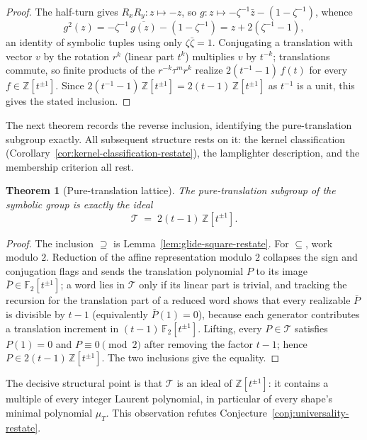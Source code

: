 \documentclass[11pt]{article}
\theoremstyle{plain}
\newtheorem{theorem}{Theorem}
\theoremstyle{definition}
\theoremstyle{remark}
\begin{document}
\begin{proof}
The half-turn gives $R_x R_y \colon z \mapsto -z$, so
$g \colon z \mapsto -\zeta^{-1}\bar z - (1 - \zeta^{-1})$, whence
\[
g^2(z) = -\zeta^{-1}\,\overline{g(z)} - (1-\zeta^{-1})
= z + 2(\zeta^{-1}-1),
\]
an identity of symbolic tuples using only $\zeta\bar\zeta = 1$.
Conjugating a translation with vector $v$ by the rotation $r^{k}$
(linear part $t^{k}$) multiplies $v$ by $t^{-k}$; translations commute,
so finite products of the $r^{-k}\tau^m r^{k}$ realize
$2(t^{-1}-1)\,f(t)$ for every $f \in \mathbb{Z}[t^{\pm 1}]$. Since
$2(t^{-1}-1)\,\mathbb{Z}[t^{\pm 1}] = 2(t-1)\,\mathbb{Z}[t^{\pm 1}]$ as
$t^{-1}$ is a unit, this gives the stated inclusion.
\end{proof}

The next theorem records the reverse inclusion, identifying the
pure-translation subgroup exactly. All subsequent structure rests on it:
the kernel classification (Corollary~\ref{cor:kernel-classification-restate}),
the lamplighter description, and the membership criterion all rest.

\begin{theorem}[Pure-translation lattice]
\label{thm:translation-lattice-symbolic}
The pure-translation subgroup of the symbolic group is exactly the ideal
\[
\mathcal{T} \;=\; 2(t-1)\,\mathbb{Z}[t^{\pm 1}].
\]
\end{theorem}

\begin{proof}
The inclusion $\supseteq$ is
Lemma~\ref{lem:glide-square-restate}. For $\subseteq$, work modulo $2$.
Reduction of the affine representation modulo $2$ collapses the sign and
conjugation flags and sends the translation polynomial $P$ to its image
$\bar P \in \mathbb{F}_2[t^{\pm 1}]$; a word lies in $\mathcal{T}$ only if
its linear part is trivial, and tracking the recursion for the
translation part of a reduced word shows that every realizable $\bar P$
is divisible by $t-1$ (equivalently $\bar P(1) = 0$), because each
generator contributes a translation increment in
$(t-1)\,\mathbb{F}_2[t^{\pm 1}]$. Lifting, every $P \in \mathcal{T}$
satisfies $P(1)=0$ and $P \equiv 0 \pmod 2$ after removing the factor
$t-1$; hence $P \in 2(t-1)\,\mathbb{Z}[t^{\pm 1}]$. The two inclusions
give the equality.
\end{proof}

The decisive structural point is that $\mathcal{T}$ is an ideal of
$\mathbb{Z}[t^{\pm 1}]$: it contains a multiple of every integer Laurent
polynomial, in particular of every shape's minimal polynomial $\mu_T$.
This observation refutes Conjecture~\ref{conj:universality-restate}.
\end{document}
